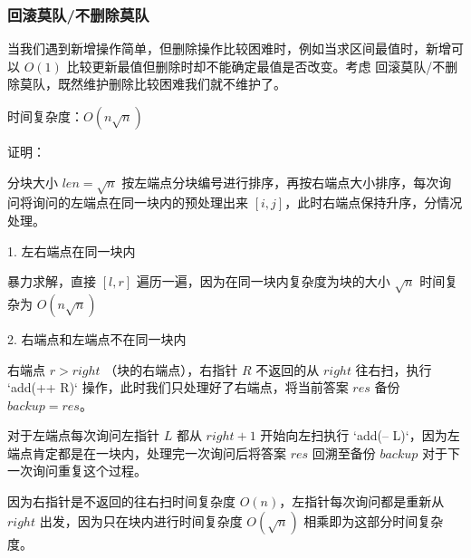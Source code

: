 \documentclass[12pt, a4paper, oneside]{ctexart}
\begin{document}
\newpage 
\subsubsection{回滚莫队/不删除莫队} 
当我们遇到新增操作简单，但删除操作比较困难时，例如当求区间最值时，新增可以 $O(1)$ 比较更新最值但删除时却不能确定最值是否改变。考虑 回滚莫队/不删除莫队，既然维护删除比较困难我们就不维护了。\par


时间复杂度：$O(n\sqrt n)$\par

证明：\par

分块大小 $len = \sqrt n$ 按左端点分块编号进行排序，再按右端点大小排序，每次询问将询问的左端点在同一块内的预处理出来 $[i, j]$，此时右端点保持升序，分情况处理。\par

1. 左右端点在同一块内\par
   暴力求解，直接 $[l, r]$ 遍历一遍，因为在同一块内复杂度为块的大小 $\sqrt n$ 时间复杂为 $O(n\sqrt n)$\par

2. 右端点和左端点不在同一块内\par
   右端点 $r > right$ （块的右端点），右指针 $R$ 不返回的从 $right$ 往右扫，执行 `add(++ R)` 操作，此时我们只处理好了右端点，将当前答案 $res$ 备份 $backup = res$。\par

   对于左端点每次询问左指针 $L$ 都从 $right + 1$ 开始向左扫执行 `add(-- L)`，因为左端点肯定都是在一块内，处理完一次询问后将答案 $res$ 回溯至备份 $backup$ 对于下一次询问重复这个过程。\par

   因为右指针是不返回的往右扫时间复杂度 $O(n)$，左指针每次询问都是重新从 $right$ 出发，因为只在块内进行时间复杂度 $O(\sqrt n)$ 相乘即为这部分时间复杂度。\par
\end{document}
